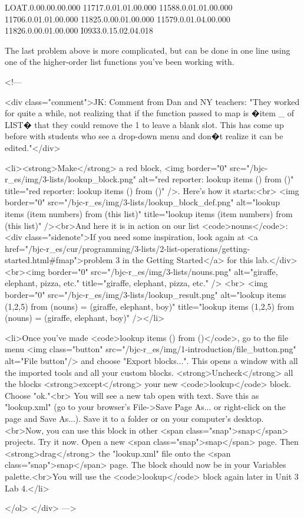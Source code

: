 LOAT.0.00.00.00.000
11717.0.01.01.00.000
11588.0.01.01.00.000
11706.0.01.01.00.000
11825.0.00.01.00.000
11579.0.01.04.00.000
11826.0.00.01.00.000
I0933.0.15.02.04.018




The last problem above is more complicated, but can be done in one line using one of the higher-order list functions you've been working with. 





<!---        

<div class="comment">JK: Comment from Dan and NY teachers: "They worked for quite a while, not realizing that if the function passed to map is �item _ of LIST� that they could remove the 1 to leave a blank slot.  This has come up before with students who see a drop-down menu and don�t realize it can be edited."</div>
        
        <li><strong>Make</strong> a red block, <img border="0" src="/bjc-r_es/img/3-lists/lookup_block.png" alt="red reporter: lookup items () from ()" title="red reporter: lookup items () from ()" />. Here's how it starts:<br> <img border="0" src="/bjc-r_es/img/3-lists/lookup_block_def.png" alt="lookup items (item numbers) from (this list)" title="lookup items (item numbers) from (this list)" /><br>And here it is in action on our list <code>nouns</code>:<div class="sidenote">If you need some inspiration, look again at <a href="/bjc-r_es/cur/programming/3-lists/2-list-operations/getting-started.html#fmap">problem 3 in the Getting Started</a> for this lab.</div><br><img border="0" src="/bjc-r_es/img/3-lists/nouns.png" alt="giraffe, elephant, pizza, etc." title="giraffe, elephant, pizza, etc." /> <br> <img border="0" src="/bjc-r_es/img/3-lists/lookup_result.png" alt="lookup items (1,2,5) from (nouns) = (giraffe, elephant, boy)" title="lookup items (1,2,5) from (nouns) = (giraffe, elephant, boy)" /></li>
        

 
        
        
        
        
        
        
        
        
                
        <li>Once you've made <code>lookup items () from ()</code>, go to the file menu <img class="button" src="/bjc-r_es/img/1-introduction/file_button.png" alt="File button"/> and choose "Export blocks...". This opens a window with all the imported tools and all your custom blocks. <strong>Uncheck</strong> all the blocks <strong>except</strong> your new <code>lookup</code> block. Choose "ok."<br> You will see a new tab open with text. Save this as "lookup.xml" (go to your browser's File->Save Page As... or right-click on the page and Save As...). Save it to a folder or on your computer's desktop.<br>Now, you can use this block in other <span class="snap">snap</span> projects. Try it now. Open a new <span class="snap">snap</span> page. Then <strong>drag</strong> the "lookup.xml" file onto the <span class="snap">snap</span> page. The block should now be in your Variables palette.<br>You will use the <code>lookup</code> block again later in Unit 3 Lab 4.</li>
        
    </ol>
    </div>
--->